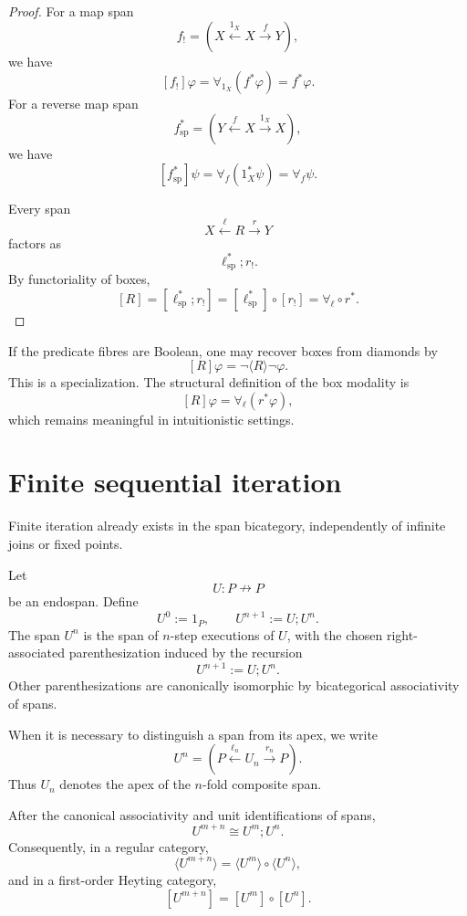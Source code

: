 \begin{proof}
For a map span
\[
f_!
=
\left(
X\xleftarrow{1_X}X\xrightarrow{f}Y
\right),
\]
we have
\[
[f_!]\varphi
=
\forall_{1_X}(f^\ast\varphi)
=
f^\ast\varphi.
\]
For a reverse map span
\[
f^\ast_{\mathrm{sp}}
=
\left(
Y\xleftarrow{f}X\xrightarrow{1_X}X
\right),
\]
we have
\[
[f^\ast_{\mathrm{sp}}]\psi
=
\forall_f(1_X^\ast\psi)
=
\forall_f\psi.
\]

Every span
\[
X\xleftarrow{\ell}R\xrightarrow{r}Y
\]
factors as
\[
\ell^\ast_{\mathrm{sp}};r_!.
\]
By functoriality of boxes,
\[
[R]
=
[\ell^\ast_{\mathrm{sp}};r_!]
=
[\ell^\ast_{\mathrm{sp}}]\circ [r_!]
=
\forall_\ell\circ r^\ast.
\]
\end{proof}

\begin{remark}
\label{rem:box-not-boolean-dual}
If the predicate fibres are Boolean, one may recover boxes from diamonds by
\[
[R]\varphi=\neg\langle R\rangle\neg\varphi.
\]
This is a specialization. The structural definition of the box modality is
\[
[R]\varphi=\forall_\ell(r^\ast\varphi),
\]
which remains meaningful in intuitionistic settings.
\end{remark}

\section{Finite sequential iteration}
\label{sec:finite-sequential-iteration}

Finite iteration already exists in the span bicategory, independently of infinite joins or fixed points.

Let
\[
U:P\nrightarrow P
\]
be an endospan. Define
\[
U^0:=1_P,
\qquad
U^{n+1}:=U;U^n.
\]
The span \(U^n\) is the span of \(n\)-step executions of \(U\), with the chosen right-associated parenthesization induced by the recursion
\[
U^{n+1}:=U;U^n.
\]
Other parenthesizations are canonically isomorphic by bicategorical associativity of spans.

When it is necessary to distinguish a span from its apex, we write
\[
U^n=
\left(
P\xleftarrow{\ell_n}U_n\xrightarrow{r_n}P
\right).
\]
Thus \(U_n\) denotes the apex of the \(n\)-fold composite span.

\begin{proposition}
\label{prop:finite-sequential-laws}
After the canonical associativity and unit identifications of spans,
\[
U^{m+n}\cong U^m;U^n.
\]
Consequently, in a regular category,
\[
\langle U^{m+n}\rangle
=
\langle U^m\rangle\circ\langle U^n\rangle,
\]
and in a first-order Heyting category,
\[
[U^{m+n}]
=
[U^m]\circ[U^n].
\]
\end{proposition}

